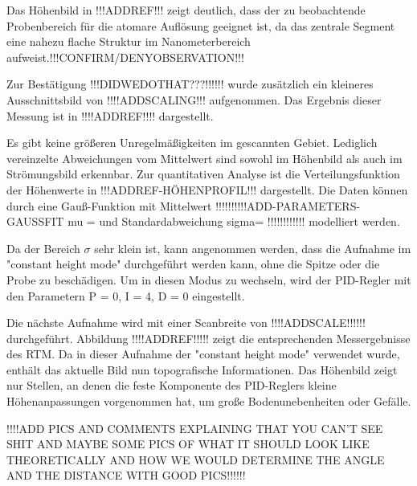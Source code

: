 Das Höhenbild in !!!ADDREF!!! zeigt deutlich, dass der zu beobachtende Probenbereich für die atomare Auflösung geeignet ist, da das zentrale Segment eine nahezu flache Struktur im Nanometerbereich aufweist.!!!CONFIRM/DENYOBSERVATION!!! 

Zur Bestätigung !!!DIDWEDOTHAT???!!!!!! wurde zusätzlich ein kleineres Ausschnittsbild von !!!!ADDSCALING!!! aufgenommen. Das Ergebnis dieser Messung ist in !!!!ADDREF!!!! dargestellt.

Es gibt keine größeren Unregelmäßigkeiten im gescannten Gebiet. Lediglich vereinzelte Abweichungen vom Mittelwert sind sowohl im Höhenbild als auch im Strömungsbild erkennbar. Zur quantitativen Analyse ist die Verteilungsfunktion der Höhenwerte in !!!ADDREF-HÖHENPROFIL!!! dargestellt. Die Daten können durch eine Gauß-Funktion mit Mittelwert !!!!!!!!!!ADD-PARAMETERS-GAUSSFIT mu =  und Standardabweichung sigma= !!!!!!!!!!!! modelliert werden.

Da der Bereich \( \sigma \) sehr klein ist, kann angenommen werden, dass die Aufnahme im "constant height mode" durchgeführt werden kann, ohne die Spitze oder die Probe zu beschädigen. Um in diesen Modus zu wechseln, wird der PID-Regler mit den Parametern P = 0, I = 4, D = 0 eingestellt.

Die nächste Aufnahme wird mit einer Scanbreite von !!!!ADDSCALE!!!!!! durchgeführt. Abbildung !!!!ADDREF!!!!! zeigt die entsprechenden Messergebnisse des RTM. Da in dieser Aufnahme der "constant height mode" verwendet wurde, enthält das aktuelle Bild nun topografische Informationen. Das Höhenbild zeigt nur Stellen, an denen die feste Komponente des PID-Reglers kleine Höhenanpassungen vorgenommen hat, um große Bodenunebenheiten oder Gefälle.

!!!!ADD PICS AND COMMENTS EXPLAINING THAT YOU CAN'T SEE SHIT AND MAYBE SOME PICS OF WHAT IT SHOULD LOOK LIKE THEORETICALLY AND HOW WE WOULD DETERMINE THE ANGLE AND THE DISTANCE WITH GOOD PICS!!!!!!